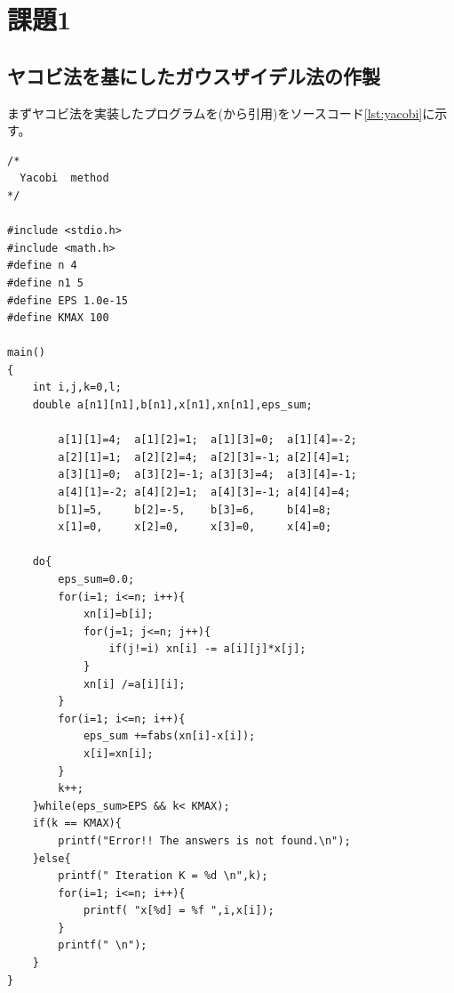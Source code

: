 \documentclass[12pt]{jsarticle}
\begin{document}
\section{課題1}
\subsection{ヤコビ法を基にしたガウスザイデル法の作製}
まずヤコビ法を実装したプログラムを(\cite{yacobiurl}から引用)をソースコード\ref{lst:yacobi}に示す。

\begin{lstlisting}[caption=yacobi.c,label={lst:yacobi}]
/*
  Yacobi  method
*/

#include <stdio.h>
#include <math.h>
#define n 4
#define n1 5
#define EPS 1.0e-15
#define KMAX 100

main()
{
	int i,j,k=0,l;
	double a[n1][n1],b[n1],x[n1],xn[n1],eps_sum;
	
		a[1][1]=4;  a[1][2]=1;  a[1][3]=0;  a[1][4]=-2;
		a[2][1]=1;  a[2][2]=4;  a[2][3]=-1; a[2][4]=1;
		a[3][1]=0;  a[3][2]=-1; a[3][3]=4;  a[3][4]=-1;
		a[4][1]=-2; a[4][2]=1;  a[4][3]=-1; a[4][4]=4;
		b[1]=5,     b[2]=-5,    b[3]=6,     b[4]=8;
		x[1]=0,     x[2]=0,     x[3]=0,     x[4]=0;
	
	do{
		eps_sum=0.0;
		for(i=1; i<=n; i++){
			xn[i]=b[i];
			for(j=1; j<=n; j++){
				if(j!=i) xn[i] -= a[i][j]*x[j];
			}
			xn[i] /=a[i][i];
		}
		for(i=1; i<=n; i++){
			eps_sum +=fabs(xn[i]-x[i]);
			x[i]=xn[i];
		}
		k++;
	}while(eps_sum>EPS && k< KMAX);
	if(k == KMAX){
		printf("Error!! The answers is not found.\n");
	}else{
		printf(" Iteration K = %d \n",k);
		for(i=1; i<=n; i++){
			printf( "x[%d] = %f ",i,x[i]);
		}
		printf(" \n");
	}
}
\end{lstlisting}
\end{document}
